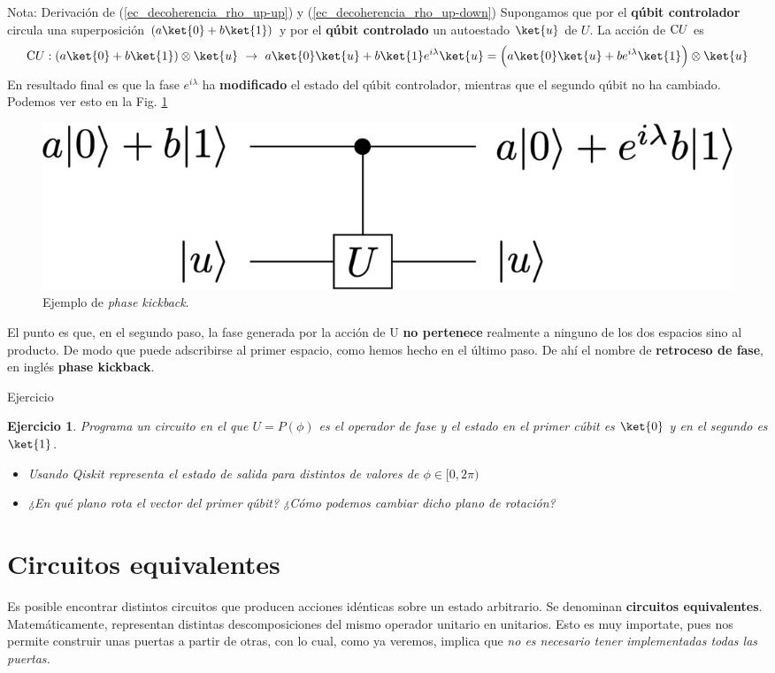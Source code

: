 \documentclass[a4paper,11pt]{book} %
\newtheorem{ejercicio_contador}{Ejercicio}
\newcommand{\Ejercicio}[1]{
		\begin{mybox_gray}{Ejercicio} 
			\begin{ejercicio_contador}
				 #1 
			\end{ejercicio_contador} 
		\end{mybox_gray}
	}
\numberwithin{equation}{chapter}
\newcommand{\cg}[1]{{\rm C}#1}
\begin{document}
\begin{mybox_blue}{Nota: Derivación de (\ref{ec_decoherencia_rho_up-up}) y  (\ref{ec_decoherencia_rho_up-down})}
Supongamos que por el \textbf{qúbit controlador} circula una superposición $(a\ket{0}+b\ket{1})$ y por el \textbf{qúbit controlado} un autoestado $\ket{u}$ de $U$.  La acción de $\cg{U}$ es
$$
\cg{U}: (a\ket{0} + b\ket{1})\otimes \ket{u} ~\to ~ a\ket{0}\ket{u} + b \ket{1}e^{i\lambda}\ket{u}  = \left( a\ket{0}\ket{u} + be^{i\lambda} \ket{1} \rule{0mm}{4mm} \right)\otimes \ket{u}
$$
En resultado final es que la fase $e^{i\lambda}$ ha \textbf{modificado} el estado del qúbit controlador, mientras que el segundo qúbit no ha cambiado. Podemos ver esto en la Fig. \ref{Fig_elementos_phase_kickback.}

		\begin{figure}[H]
		\centering 
		\includegraphics[width=0.45\linewidth]{Figuras/Fig_elementos_phase_kickback}
		\caption{Ejemplo de \textit{phase kickback}.}
		\label{Fig_elementos_phase_kickback.}
		\end{figure}

El punto es que, en el segundo paso, la fase generada por la acción de U \textbf{no pertenece} realmente a ninguno de los dos espacios sino al producto. De modo que puede adscribirse al primer espacio, como hemos hecho en el último paso. De ahí el nombre de \textbf{retroceso de fase}, en inglés \textbf{phase kickback}.

	\Ejercicio{Programa un circuito en el que  $U = P(\phi)$ es el operador de fase y el estado en el primer cúbit es $\ket{0}$ y en el segundo es $\ket{1}$. 
	\begin{itemize}
		\item[a)] Usando Qiskit representa el estado de salida para distintos de valores de $\phi \in [0, 2 \pi )$
		
		\item[b)] ¿En qué plano rota el vector del primer qúbit? ¿Cómo podemos cambiar dicho plano de rotación?
	\end{itemize}
	}	   
    


	\section{Circuitos equivalentes}

Es posible encontrar distintos circuitos que producen acciones idénticas sobre un estado arbitrario. Se denominan \textbf{circuitos equivalentes}. Matemáticamente, representan distintas descomposiciones del mismo operador unitario en unitarios. Esto es muy importate, pues nos permite construir unas puertas a partir de otras, con lo cual, como ya veremos, implica que  \textit{no es necesario tener implementadas todas las puertas.}



\end{mybox_blue}
\end{document}
